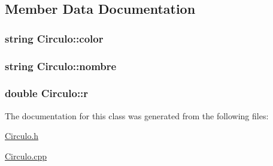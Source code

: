 \subsection{Member Data Documentation}
\hypertarget{class_circulo_a617c127941b509f6265ab59c141d7fea}{
\subsubsection[{color}]{\setlength{\rightskip}{0pt plus 5cm}string Circulo\+::color}}\label{class_circulo_a617c127941b509f6265ab59c141d7fea}
\hypertarget{class_circulo_a4ab11e667cbed98312c5f1688bf486c0}{
\subsubsection[{nombre}]{\setlength{\rightskip}{0pt plus 5cm}string Circulo\+::nombre}}\label{class_circulo_a4ab11e667cbed98312c5f1688bf486c0}
\hypertarget{class_circulo_a90d30bcb1273ecf1467b78d890504bcb}{
\subsubsection[{r}]{\setlength{\rightskip}{0pt plus 5cm}double Circulo\+::r}}\label{class_circulo_a90d30bcb1273ecf1467b78d890504bcb}


The documentation for this class was generated from the following files\+:\begin{DoxyCompactItemize}
\item 
\hyperlink{_circulo_8h}{Circulo.\+h}\item 
\hyperlink{_circulo_8cpp}{Circulo.\+cpp}\end{DoxyCompactItemize}
